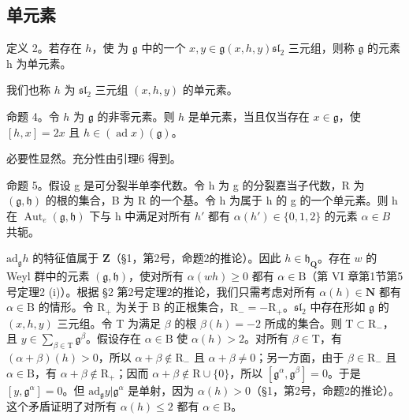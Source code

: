 \subsection{单元素}

定义 2。若存在 \(h\)，使  为 \(\mathfrak{g}\) 中的一个 \(x, y \in \mathfrak{g}\)\((x, h, y)\)\(\mathfrak{sl}_2\) 三元组，则称 \(\mathfrak{g}\) 的元素 h 为单元素。

我们也称 \(h\) 为 \(\mathfrak{sl}_2\) 三元组 \((x, h, y)\) 的单元素。

命题 4。令 \(h\) 为 \(\mathfrak{g}\) 的非零元素。则 \(h\) 是单元素，当且仅当存在 \(x \in \mathfrak{g}\)，使 \([h, x] = 2x\) 且 \(h \in (\operatorname{ad} x)(\mathfrak{g})\)。

必要性显然。充分性由引理6 得到。

命题 5。假设 g 是可分裂半单李代数。令 h 为 g 的分裂嘉当子代数，R 为 \((\mathfrak{g},\mathfrak{h})\) 的根的集合，B 为 R 的一个基。令 h 为属于 h 的 g 的一个单元素。则 h 在 \(\operatorname{Aut}_{e}(\mathfrak{g},\mathfrak{h})\) 下与 h 中满足对所有 \(h'\) 都有 \(\alpha(h') \in \{0,1,2\}\) 的元素 \(\alpha \in B\) 共轭。

\(\mathrm{ad}_{\mathfrak{g}}h\) 的特征值属于 \(\mathbf{Z}\)（§1，第2号，命题2的推论）。因此 \(h \in \mathfrak{h}_{\mathbf{Q}}\)。存在 \(w\) 的 Weyl 群中的元素 \((\mathfrak{g}, \mathfrak{h})\)，使对所有 \(\alpha(wh) \geq 0\) 都有 \(\alpha \in \mathrm{B}\)（第 VI 章第1节第5号定理2 (i)）。根据 §2 第2号定理2的推论，我们只需考虑对所有 \(\alpha(h) \in \mathbf{N}\) 都有 \(\alpha \in \mathrm{B}\) 的情形。令 \(\mathrm{R}_{+}\) 为关于 B 的正根集合，\(\mathrm{R}_{-} = -\mathrm{R}_{+}\)。\(\mathfrak{sl}_2\) 中存在形如 \(\mathfrak{g}\) 的 \((x, h, y)\) 三元组。令 T 为满足 \(\beta\) 的根 \(\beta(h) = -2\) 所成的集合。则 \(\mathrm{T} \subset \mathrm{R}_{-}\)，且 \(y \in \sum_{\beta \in \mathrm{T}} \mathfrak{g}^{\beta}\)。假设存在 \(\alpha \in \mathrm{B}\) 使 \(\alpha(h) > 2\)。对所有 \(\beta \in \mathrm{T}\)，有 \((\alpha + \beta)(h) > 0\)，所以 \(\alpha + \beta \notin \mathrm{R}_{-}\) 且 \(\alpha + \beta \neq 0\)；另一方面，由于 \(\beta \in \mathrm{R}_{-}\) 且 \(\alpha \in \mathrm{B}\)，有 \(\alpha + \beta \notin \mathrm{R}_{+}\)；因而 \(\alpha + \beta \notin \mathrm{R} \cup \{0\}\)，所以 \([\mathfrak{g}^{\alpha}, \mathfrak{g}^{\beta}] = 0\)。于是 \([y, \mathfrak{g}^{\alpha}] = 0\)。但 \(\mathrm{ad}_{\mathfrak{g}}y|\mathfrak{g}^{\alpha}\) 是单射，因为 \(\alpha(h) > 0\)（§1，第2号，命题2的推论）。这个矛盾证明了对所有 \(\alpha(h) \leq 2\) 都有 \(\alpha \in \mathrm{B}\)。

